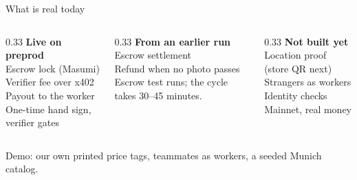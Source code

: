 \begin{frame}{What is real today}
  \small
  \begin{columns}[T]
    \begin{column}{0.33\textwidth}
      {\bfseries\color{okgreen} Live on preprod}\\[0.4em]
      Escrow lock (Masumi)\\
      Verifier fee over x402\\
      Payout to the worker\\
      One-time hand sign, verifier gates
    \end{column}
    \begin{column}{0.33\textwidth}
      {\bfseries\color{cardano} From an earlier run}\\[0.4em]
      Escrow settlement\\
      Refund when no photo passes\\[0.4em]
      {\scriptsize Escrow test runs; the cycle takes 30--45 minutes.}
    \end{column}
    \begin{column}{0.33\textwidth}
      {\bfseries\color{nogo} Not built yet}\\[0.4em]
      Location proof (store QR next)\\
      Strangers as workers\\
      Identity checks\\
      Mainnet, real money
    \end{column}
  \end{columns}
  \vspace{1em}
  {\scriptsize Demo: our own printed price tags, teammates as workers, a seeded Munich catalog.}
\end{frame}
